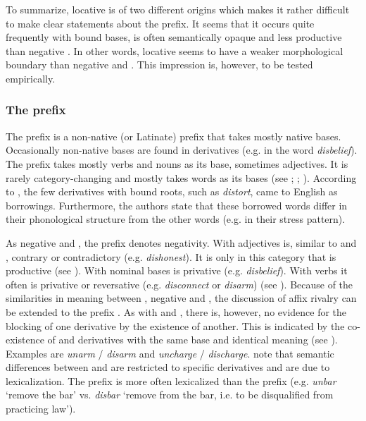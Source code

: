 To summarize, locative  is of two different origins which makes it rather difficult to make clear statements about the prefix. It seems that it occurs quite frequently with bound bases, is often semantically opaque and less productive than negative . In other words, locative  seems to have a weaker morphological boundary than negative  and . This impression is, however, to be tested empirically.

 
\subsubsection{The prefix }

The prefix  is a non-native (or Latinate) prefix that takes mostly native bases. Occasionally non-native bases are found in derivatives (e.g. in the word \textit{disbelief}). The prefix takes mostly verbs and nouns as its base, sometimes adjectives. It is rarely category-changing and mostly takes words as its bases (see \citealt[481]{Jespersen.1965}; \citealt[158 ff]{Marchand.1969}; \citealt[355, 357]{Bauer.2013}).
According to \citet[358]{Bauer.2013}, the few derivatives with bound roots, such as \textit{distort}, came to English as borrowings. Furthermore, the authors state that these borrowed words differ in their phonological structure from the other words (e.g. in their stress pattern).


As negative  and , the prefix  denotes negativity.  With adjectives  is, similar to  and , contrary or contradictory (e.g. \textit{dishonest}). It is only in this category that  is productive (see \citealt[358]{Bauer.2013}). With nominal bases  is privative (e.g. \textit{disbelief}). With verbs it often is privative or reversative (e.g. \textit{disconnect} or \textit{disarm})  (see \citealt[372, 375]{Bauer.2013}).
Because of the similarities in meaning between , negative  and , the discussion of affix rivalry can be extended to the prefix . 
As with  and , there is, however, no evidence for the blocking of one derivative by the existence of another. This is indicated by the co-existence of  and derivatives with the same base and identical meaning (see \citealt[380]{Bauer.2013}). Examples are \textit{unarm} / \textit{disarm} and \textit{uncharge} / \textit{discharge}. 
\citet[380]{Bauer.2013} note that semantic differences between  and  are restricted to specific derivatives and are due to lexicalization. The prefix  is more often lexicalized than the prefix  (e.g. \textit{unbar} `remove the bar' vs. \textit{disbar} `remove from the bar, i.e. to be disqualified from practicing law').


